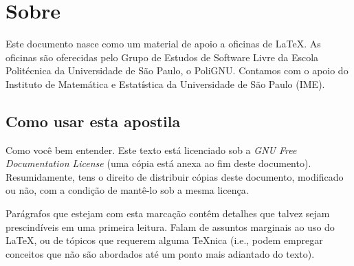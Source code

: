 \section*{Sobre}

Este documento nasce como um material de apoio a oficinas de
\LaTeX. As oficinas são oferecidas pelo Grupo de Estudos de Software
Livre da Escola Politécnica da Universidade de São Paulo, o PoliGNU.
Contamos com o apoio do Instituto de Matemática e Estatística da
Universidade de São Paulo (IME).

\subsection*{Como usar esta apostila}

Como você bem entender. Este texto está licenciado sob a \emph{GNU Free
Documentation License} (uma cópia está anexa ao fim deste documento).
Resumidamente, tens o direito de distribuir cópias deste documento,
modificado ou não, com a condição de mantê-lo sob a mesma licença.

\begin{detalhe}
Parágrafos que estejam com esta marcação contêm detalhes que talvez
sejam prescindíveis em uma primeira leitura. Falam de assuntos
marginais ao uso do \LaTeX, ou de tópicos que requerem alguma
\TeX nica (i.e., podem empregar conceitos que não são abordados até
um ponto mais adiantado do texto).
\end{detalhe}

\clearpage
